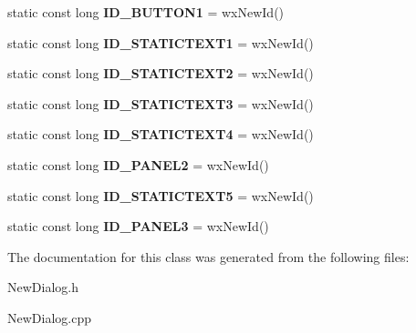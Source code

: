 \begin{DoxyCompactItemize}
\item 
\hypertarget{class_new_dialog_a19d3f77775795f2dffa1c779f42e26e6}{static const long {\bfseries I\+D\+\_\+\+B\+U\+T\+T\+O\+N1} = wx\+New\+Id()}\label{class_new_dialog_a19d3f77775795f2dffa1c779f42e26e6}

\item 
\hypertarget{class_new_dialog_a7a0d550ea58e2fadee155ac45a46c685}{static const long {\bfseries I\+D\+\_\+\+S\+T\+A\+T\+I\+C\+T\+E\+X\+T1} = wx\+New\+Id()}\label{class_new_dialog_a7a0d550ea58e2fadee155ac45a46c685}

\item 
\hypertarget{class_new_dialog_a3a9f98f40ade560c2c9710b7195c680f}{static const long {\bfseries I\+D\+\_\+\+S\+T\+A\+T\+I\+C\+T\+E\+X\+T2} = wx\+New\+Id()}\label{class_new_dialog_a3a9f98f40ade560c2c9710b7195c680f}

\item 
\hypertarget{class_new_dialog_ac1b9d026a8c92df5e7c7284aaf788a00}{static const long {\bfseries I\+D\+\_\+\+S\+T\+A\+T\+I\+C\+T\+E\+X\+T3} = wx\+New\+Id()}\label{class_new_dialog_ac1b9d026a8c92df5e7c7284aaf788a00}

\item 
\hypertarget{class_new_dialog_a55ba13f3328ccadcf9a171d30558b06f}{static const long {\bfseries I\+D\+\_\+\+S\+T\+A\+T\+I\+C\+T\+E\+X\+T4} = wx\+New\+Id()}\label{class_new_dialog_a55ba13f3328ccadcf9a171d30558b06f}

\item 
\hypertarget{class_new_dialog_a0be6b5ca68521b8a6378d3d74d6e7690}{static const long {\bfseries I\+D\+\_\+\+P\+A\+N\+E\+L2} = wx\+New\+Id()}\label{class_new_dialog_a0be6b5ca68521b8a6378d3d74d6e7690}

\item 
\hypertarget{class_new_dialog_a6c4dea442453e0a5a160f9c27a755d0d}{static const long {\bfseries I\+D\+\_\+\+S\+T\+A\+T\+I\+C\+T\+E\+X\+T5} = wx\+New\+Id()}\label{class_new_dialog_a6c4dea442453e0a5a160f9c27a755d0d}

\item 
\hypertarget{class_new_dialog_a0784f1e99fc71920ff777b3db5a1c5e7}{static const long {\bfseries I\+D\+\_\+\+P\+A\+N\+E\+L3} = wx\+New\+Id()}\label{class_new_dialog_a0784f1e99fc71920ff777b3db5a1c5e7}

\end{DoxyCompactItemize}


The documentation for this class was generated from the following files\+:\begin{DoxyCompactItemize}
\item 
New\+Dialog.\+h\item 
New\+Dialog.\+cpp\end{DoxyCompactItemize}
